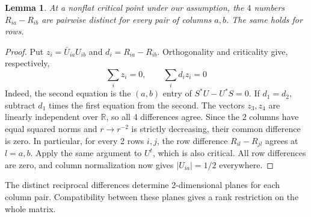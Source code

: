 \documentclass[11pt,a4paper]{article}
\newtheorem{lem}[thm]{Lemma}
\begin{document}
\begin{lem}\label{distinctdifferences}
At a nonflat critical point under our assumption, the $4$ numbers
$R_{ia}-R_{ib}$ are pairwise distinct for every pair of columns $a,b$.
The same holds for rows.
\end{lem}
\begin{proof}
Put $z_i=\bar U_{ia}U_{ib}$ and $d_i=R_{ia}-R_{ib}$. Orthogonality and
criticality give, respectively,
\[
 \sum_i z_i=0,\qquad \sum_i d_i z_i=0
\]
Indeed, the second equation is the $(a,b)$ entry of $S^*U-U^*S=0$.
If $d_1=d_2$, subtract $d_1$ times the first equation from the second.
The vectors $z_3,z_4$ are linearly independent over $\mathbb R$, so all
4 differences agree. Since the 2 columns have equal squared norms
and $r\to r^{-2}$ is strictly decreasing, their common difference
is zero. In particular, for every 2 rows $i,j$, the row difference
$R_{il}-R_{jl}$ agrees at $l=a,b$. Apply the same argument to
$U^t$, which is also critical. All row differences are zero, and column
normalization now gives $|U_{ia}|=1/2$ everywhere.
\end{proof}

The distinct reciprocal differences determine 2-dimensional planes
for each column pair. Compatibility between these planes gives a rank
restriction on the whole matrix.
\end{document}
